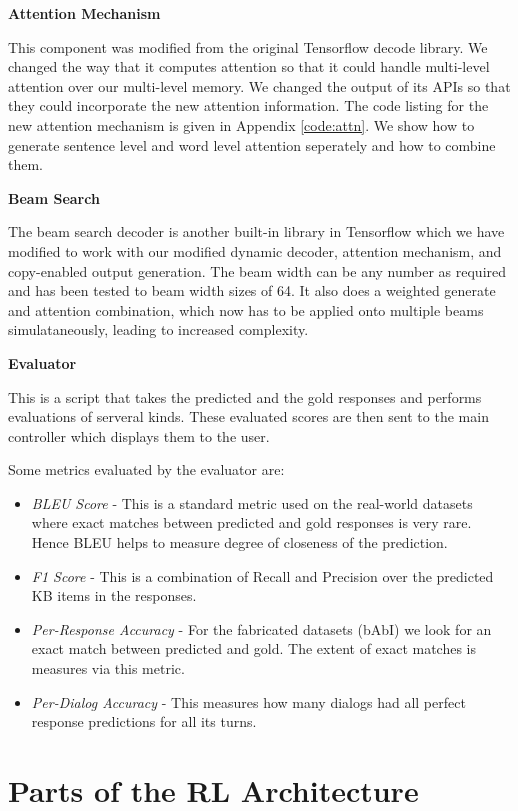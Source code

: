 \noindent\textbf{Attention Mechanism}

This component was modified from the original Tensorflow decode library. We changed the way that it computes attention so that it could handle multi-level attention over our multi-level {} memory. We changed the output of its APIs so that they could incorporate the new attention information. The code listing for the new attention mechanism is given in Appendix \ref{code:attn}. We show how to generate sentence level and word level attention seperately and how to combine them.

\noindent\textbf{Beam Search}

The beam search decoder is another built-in library in Tensorflow which we have modified to work with our modified dynamic decoder, attention mechanism, and copy-enabled output generation. The beam width can be any number as required and has been tested to beam width sizes of 64. It also does a weighted generate and attention combination, which now has to be applied onto multiple beams simulataneously, leading to increased complexity.

\noindent\textbf{Evaluator}

This is a script that takes the predicted and the gold responses and performs evaluations of serveral kinds. These evaluated scores are then sent to the main controller which displays them to the user. 

Some metrics evaluated by the evaluator are:
\begin{itemize}
	\item \emph{BLEU Score} - This is a standard metric used on the real-world datasets where exact matches between predicted and gold responses is very rare. Hence BLEU helps to measure degree of closeness of the prediction.
	\item \emph{F1 Score} - This is a combination of Recall and Precision over the predicted KB items in the responses.
	\item \emph{Per-Response Accuracy} - For the fabricated datasets (bAbI) we look for an exact match between predicted and gold. The extent of exact matches is measures via this metric.
	\item \emph{Per-Dialog Accuracy} - This measures how many dialogs had all perfect response predictions for all its turns.
\end{itemize}

\section{Parts of the \sys\-RL Architecture}

